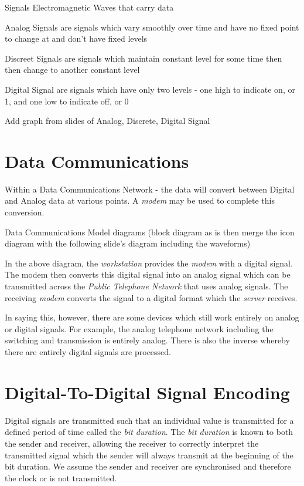 \begin{define}
\item[Signals] Electromagnetic Waves that carry data 
\item[Analog Signals]  are signals which vary smoothly over time and have no fixed point to change at and don't have fixed levels
\item[Discreet Signals] are signals which maintain constant level for some time then then change to another constant level
\item[Digital Signal] are signals which have only two levels - one high to indicate on, or 1, and one low to indicate off, or 0
\end{define}


\begin{todo}
Add graph from slides of Analog, Discrete, Digital Signal
\end{todo}

\section{Data Communications}
Within a Data Communications Network - the data will convert between Digital and Analog data at various points. A \textit{modem} may be used to complete this conversion.

\begin{todo}
    Data Communications Model diagrams (block diagram as is then merge the icon diagram with the following slide's diagram including the waveforms)
\end{todo}

In the above diagram, the \textit{workstation} provides the \textit{modem} with a digital signal. The modem then converts this digital signal into an analog signal which can be transmitted across the \textit{Public Telephone Network} that uses analog signals. The receiving \textit{modem} converts the signal to a digital format which the \textit{server} receives. 

In saying this, however, there are some devices which still work entirely on analog or digital signals. For example, the analog telephone network including the switching and transmission is entirely analog. There is also the inverse whereby there are entirely digital signals are processed. 

\section{Digital-To-Digital Signal Encoding}
Digital signals are transmitted such that an individual value is transmitted for a defined period of time called the \textit{bit duration}. The \textit{bit duration} is known to both the sender and receiver, allowing the receiver to correctly interpret the transmitted signal which the sender will always transmit at the beginning of the bit duration. We assume the sender and receiver are synchronised and therefore the clock or is not transmitted.

